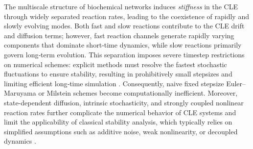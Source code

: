 \documentclass{article}
\begin{document}


The multiscale structure of biochemical networks induces \textit{stiffness} in the CLE through widely separated reaction rates, leading to the coexistence of rapidly and slowly evolving modes. Both fast and slow reactions contribute to the CLE drift and diffusion terms; however, fast reaction channels generate rapidly varying components that dominate short‑time dynamics, while slow reactions primarily govern long‑term evolution.
This separation imposes severe timestep restrictions on numerical schemes: explicit methods must resolve the fastest stochastic fluctuations to ensure stability, resulting in prohibitively small stepsizes and limiting efficient long‑time simulation \cite{haseltine2002approximate,hepp2015adaptive}. 
Consequently, naive fixed stepsize Euler–Maruyama or Milstein schemes become computationally inefficient. 
Moreover, state-dependent diffusion, intrinsic stochasticity, and strongly
coupled nonlinear reaction rates further complicate the numerical behavior of
CLE systems and limit the applicability of classical stability analysis, which
typically relies on simplified assumptions such as additive noise, weak
nonlinearity, or decoupled dynamics \cite{gillespie1977exact,longtin2003effects,pucci2018deciphering}.
\end{document}
